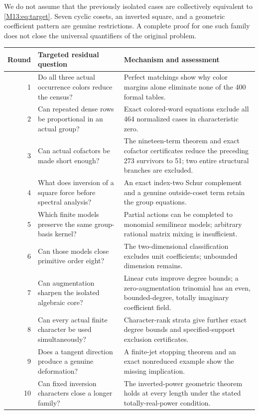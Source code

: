 \documentclass[11pt,a4paper,oneside]{report}
\theoremstyle{definition}
\theoremstyle{remark}
\begin{document}
We do not assume that the previously isolated cases are collectively
equivalent to \eqref{M13:eq:target}. Seven cyclic cosets, an inverted
square, and a geometric coefficient pattern are genuine restrictions.
A complete proof for one such family does not close the universal
quantifiers of the original problem.

\begin{center}
\small
\begin{tabular}{@{}r>{\raggedright\arraybackslash}p{.38\linewidth}
 >{\raggedright\arraybackslash}p{.47\linewidth}@{}}
\toprule
Round & Targeted residual question & Mechanism and assessment\\
\midrule
1 & Do all three actual occurrence colors reduce the census? &
Perfect matchings show why color margins alone eliminate none
of the 400 formal tables.\\[3pt]
2 & Can repeated dense rows be proportional in an actual group? &
Exact colored-word equations exclude all 464 normalized cases
in characteristic zero.\\[3pt]
3 & Can actual cofactors be made short enough? &
The nineteen-term theorem and exact cofactor certificates reduce
the preceding 273 survivors to 51; two entire structural branches
are excluded.\\[3pt]
4 & What does inversion of a square force before spectral analysis? &
An exact index-two Schur complement and a genuine outside-coset
term retain the group equations.\\[3pt]
5 & Which finite models preserve the same group-basis kernel? &
Partial actions can be completed to monomial semilinear models;
arbitrary rational matrix mixing is insufficient.\\[3pt]
6 & Can those models close primitive order eight? &
The two-dimensional classification excludes unit coefficients;
unbounded dimension remains.\\[3pt]
7 & Can augmentation sharpen the isolated algebraic core? &
Linear cuts improve degree bounds; a zero-augmentation trinomial
has an even, bounded-degree, totally imaginary coefficient field.\\[3pt]
8 & Can every actual finite character be used simultaneously? &
Character-rank strata give further exact degree bounds and
specified-support exclusion certificates.\\[3pt]
9 & Does a tangent direction produce a genuine deformation? &
A finite-jet stopping theorem and an exact nonreduced example
show the missing implication.\\[3pt]
10 & Can fixed inversion characters close a longer family? &
The inverted-power geometric theorem holds at every length
under the stated totally-real-power condition.\\
\bottomrule
\end{tabular}
\end{center}
\end{document}
